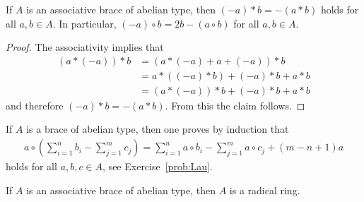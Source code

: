 \begin{lemma}
    If $A$ is an associative brace of abelian type, then 
	$(-a)*b=-(a*b)$ 
	holds for all $a,b\in A$. In particular, $(-a)\circ b=2b-(a\circ b)$ for all $a,b\in A$. 
\end{lemma}

\begin{proof}
    The associativity implies that 
 	\begin{align*}
 	    (a*(-a))*b &= 
 	    (a*(-a)+a+(-a))*b\\
 	    &=a*( (-a)*b)+(-a)*b+a*b\\
 	    &=(a*(-a))*b+(-a)*b+a*b
     \end{align*}
     and therefore $(-a)*b=-(a*b)$. From this the claim follows. 
\end{proof}

If $A$ is a brace of abelian type, then one proves by induction that 
\begin{align}
\label{eq:Lau}
    a\circ \left(\sum_{i=1}^n b_i-\sum_{j=1}^mc_j\right)
    =\sum_{i=1}^n a\circ b_i-\sum_{j=1}^ma\circ c_j+(m-n+1)a
\end{align}
holds for all $a,b,c\in A$, see Exercise~\ref{prob:Lau}. 





\begin{theorem}
    \label{thm:Lau}
	If $A$ is an associative brace of abelian type, then $A$ is a radical ring. 
\end{theorem}

